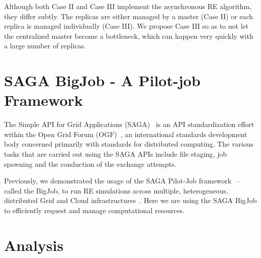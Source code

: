 \documentclass[a4paper,10pt]{article}
\newcommand{\jhanote}[1]{ {\textcolor{red} { ***shantenu: #1 }}}
\newcommand{\jhanote}[1]{}
\begin{document}
Although both Case II and Case III implement the asynchronous 
RE algorithm, they differ subtly. The replicas
are either managed by a master (Case II) or each replica
is managed individually (Case III). We propose Case III so as to not let the centralized master become a bottleneck, which can happen very quickly with a large number of replicas.

\section{SAGA BigJob - A Pilot-job Framework}

The Simple API for Grid Applications (SAGA)~\cite{saga_gfd90} is an API standardization effort within the Open Grid Forum (OGF)~\cite{ogf_web}, an international standards development body concerned primarily with standards for distributed computing. The various tasks that are carried out using the SAGA APIs include file staging, job spawning and the conduction of the exchange attempts.

Previously, we demonstrated the usage of the SAGA Pilot-Job framework~\cite{saga_bigjob_condor_cloud} -- called the BigJob, to run RE simulations across multiple, heterogeneous, distributed Grid and Cloud infrastructures~\cite{Luckow:2008fp}. Here we are using the SAGA BigJob to efficiently request and manage computational resources. 


\section{Analysis}

\end{document}
